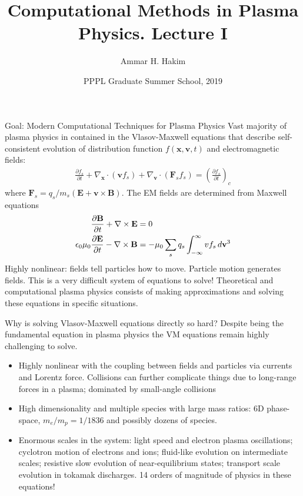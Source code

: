 \documentclass[pdf]{beamer}
\title[{\tt }] {Computational Methods in Plasma Physics. Lecture I}%
\author[http://cmpp.rtfd.io]%
{Ammar H. Hakim\inst{1}}%
\institute[PPPL]
{ \inst{1} Princeton Plasma Physics Laboratory, Princeton, NJ %
}
\date[8/12/2019]{PPPL Graduate Summer School, 2019}
\newcommand{\pfrac}[2]{\frac{\partial #1}{\partial #2}}
\newcommand{\mvec}[1]{\mathbf{#1}}
\newcommand{\gcs}{\nabla_{\mvec{x}}}
\newcommand{\gvs}{\nabla_{\mvec{v}}}
\theoremstyle{definition}
\begin{document}
\begin{frame}
  \titlepage
\end{frame}

\begin{frame}{Goal: Modern Computational Techniques for Plasma Physics}
  \footnotesize Vast majority of plasma physics in contained in the
  Vlasov-Maxwell equations that describe self-consistent evolution of
  distribution function $f(\mvec{x},\mvec{v},t)$ and electromagnetic
  fields:
  \begin{align*}
    \pfrac{f_s}{t} + \gcs\cdot (\mvec{v} f_s) + \gvs\cdot (\mvec{F}_s
    f_s) = \left( \pfrac{f_s}{t} \right)_c
  \end{align*}
  where $\mvec{F}_s=q_s/m_s (\mvec{E}+\mvec{v}\times\mvec{B})$. The EM
  fields are determined from Maxwell equations
  \begin{align*}
    \frac{\partial \mvec{B}}{\partial t} + \nabla\times\mvec{E} &= 0 \\
    \epsilon_0\mu_0\frac{\partial \mvec{E}}{\partial t} -
    \nabla\times\mvec{B} &= -\mu_0\sum_s q_s \int_{-\infty}^\infty v f_s \thinspace d\mvec{v}^3
  \end{align*}
  Highly nonlinear: fields tell particles how to move. Particle motion
  generates fields. This is a very difficult system of equations to
  solve! Theoretical and computational plasma physics consists of
  making approximations and solving these equations in specific
  situations.
\end{frame}

\begin{frame}{Why is solving Vlasov-Maxwell equations directly so
    hard?}
  Despite being the fundamental equation in plasma physics the VM
  equations remain highly challenging to solve.
  \begin{itemize}
  \item Highly nonlinear with the coupling between fields and
    particles via currents and Lorentz force. Collisions can further
    complicate things due to long-range forces in a plasma; dominated
    by small-angle collisions
  \item High dimensionality and multiple species with large mass
    ratios: 6D phase-space, $m_e/m_p = 1/1836$ and possibly dozens of
    species.
  \item Enormous scales in the system: light speed and electron plasma
    oscillations; cyclotron motion of electrons and ions; fluid-like
    evolution on intermediate scales; resistive slow evolution of
    near-equilibrium states; transport scale evolution in tokamak
    discharges.  14 orders of magnitude of physics in these
    equations!
  \end{itemize}
\end{frame}
\end{document}
